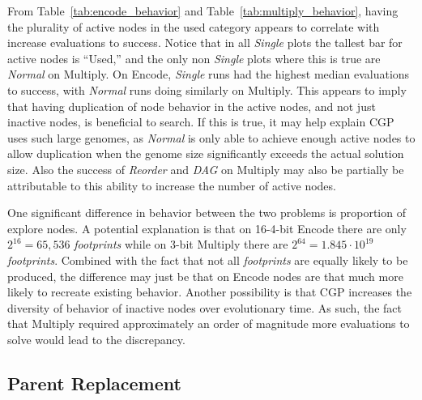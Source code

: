 \documentclass[journal]{IEEEtran}
\begin{document}
From Table~\ref{tab:encode_behavior} and Table~\ref{tab:multiply_behavior}, having
the plurality of active nodes in the used category appears to correlate with
increase evaluations to success.  Notice that in all \emph{Single} plots the
tallest bar for active nodes is ``Used,'' and the only non \emph{Single} plots
where this is true are \emph{Normal} on Multiply.  On Encode, \emph{Single}
runs had the highest median evaluations to success, with \emph{Normal} runs
doing similarly on Multiply.  This appears to imply that having duplication
of node behavior in the active nodes, and not just inactive nodes, is beneficial
to search.  If this is true, it may help explain CGP uses such large genomes,
as \emph{Normal} is only able to achieve enough active nodes to allow duplication
when the genome size significantly exceeds the actual solution size.  Also
the success of \emph{Reorder} and \emph{DAG} on Multiply may also be partially be attributable
to this ability to increase the number of active nodes.

One significant difference in behavior between the two problems is proportion of
explore nodes.  A potential explanation is that on 16-4-bit Encode there are only
$2^{16} = 65,536$ \emph{footprints} while on 3-bit Multiply there are $2^{64} = 1.845\cdot 10^{19}$
\emph{footprints}.  Combined with the fact that not all \emph{footprints} are equally
likely to be produced, the difference may just be that on Encode nodes are
that much more likely to recreate existing behavior.  Another possibility is that
CGP increases the diversity of behavior of inactive nodes over evolutionary time.
As such, the fact that Multiply required approximately an order of magnitude more
evaluations to solve would lead to the discrepancy.

\subsection{Parent Replacement}
\end{document}
